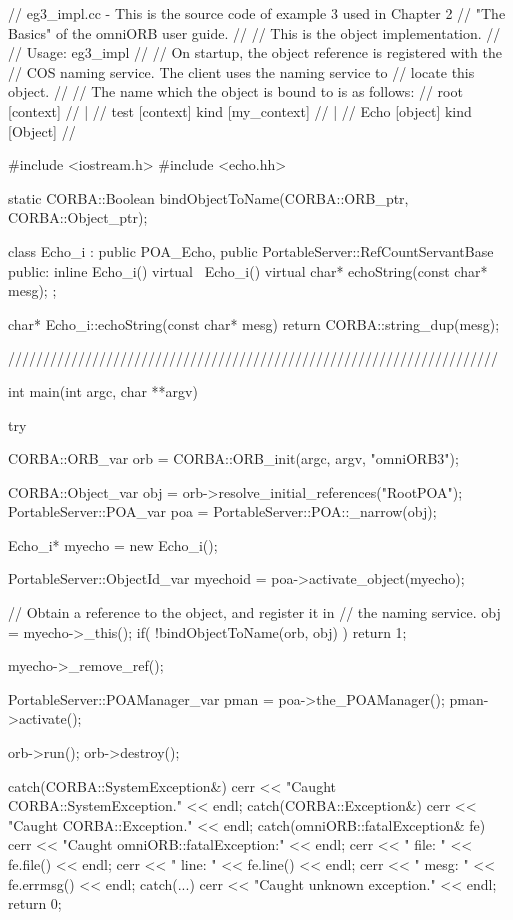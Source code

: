 \documentclass[11pt,twoside,a4paper]{book}
\begin{document}
\begin{cxxlisting}
// eg3_impl.cc - This is the source code of example 3 used in Chapter 2
//               "The Basics" of the omniORB user guide.
//
//               This is the object implementation.
//
// Usage: eg3_impl
//
//        On startup, the object reference is registered with the
//        COS naming service. The client uses the naming service to
//        locate this object.
//
//        The name which the object is bound to is as follows:
//              root  [context]
//               |
//              test  [context] kind [my_context]
//               |
//              Echo  [object]  kind [Object]
//

#include <iostream.h>
#include <echo.hh>


static CORBA::Boolean bindObjectToName(CORBA::ORB_ptr, CORBA::Object_ptr);

class Echo_i : public POA_Echo,
	       public PortableServer::RefCountServantBase
{
public:
  inline Echo_i() {}
  virtual ~Echo_i() {}
  virtual char* echoString(const char* mesg);
};

char* Echo_i::echoString(const char* mesg)
{
  return CORBA::string_dup(mesg);
}

//////////////////////////////////////////////////////////////////////

int
main(int argc, char **argv)
{
  try {
    CORBA::ORB_var orb = CORBA::ORB_init(argc, argv, "omniORB3");

    CORBA::Object_var obj = orb->resolve_initial_references("RootPOA");
    PortableServer::POA_var poa = PortableServer::POA::_narrow(obj);

    Echo_i* myecho = new Echo_i();

    PortableServer::ObjectId_var myechoid = poa->activate_object(myecho);

    // Obtain a reference to the object, and register it in
    // the naming service.
    obj = myecho->_this();
    if( !bindObjectToName(orb, obj) )
      return 1;

    myecho->_remove_ref();

    PortableServer::POAManager_var pman = poa->the_POAManager();
    pman->activate();

    orb->run();
    orb->destroy();
  }
  catch(CORBA::SystemException&) {
    cerr << "Caught CORBA::SystemException." << endl;
  }
  catch(CORBA::Exception&) {
    cerr << "Caught CORBA::Exception." << endl;
  }
  catch(omniORB::fatalException& fe) {
    cerr << "Caught omniORB::fatalException:" << endl;
    cerr << "  file: " << fe.file() << endl;
    cerr << "  line: " << fe.line() << endl;
    cerr << "  mesg: " << fe.errmsg() << endl;
  }
  catch(...) {
    cerr << "Caught unknown exception." << endl;
  }
  return 0;
}


\end{cxxlisting}
\end{document}

